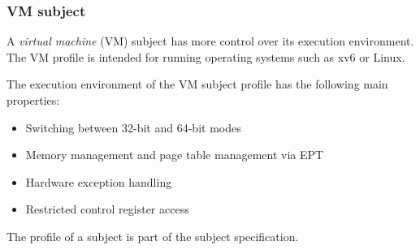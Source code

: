 \subsubsection{VM subject}
A \emph{virtual machine} (VM) subject has more control over its execution
environment. The VM profile is intended for running operating systems such as
xv6 or Linux.

The execution environment of the VM subject profile has the following main
properties:

\begin{itemize}
	\item Switching between 32-bit and 64-bit modes
	\item Memory management and page table management via EPT
	\item Hardware exception handling
	\item Restricted control register access
\end{itemize}

The profile of a subject is part of the subject specification.
